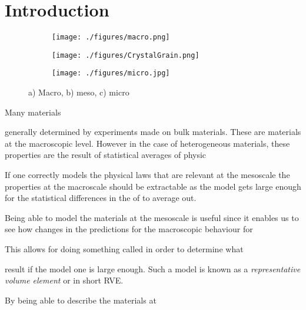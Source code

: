 \documentclass[introduction.tex]{subfiles}
\begin{document}
\chapter{Introduction}



 \begin{figure}
\centering

\begin{subfigure}{.1\textwidth}
  \centering
  \texttt{[image: ./figures/macro.png]}
  \caption{}
  \label{fig:macro}
\end{subfigure}
\label{fig:macro}
\scalebox{1.5}{$\boldsymbol{\longrightarrow}$}
\begin{subfigure}{.33\textwidth}
  \centering
  \texttt{[image: ./figures/CrystalGrain.png]}
  \caption{}
  \label{fig:meso}
\end{subfigure}%
\scalebox{1.5}{$\boldsymbol{\longrightarrow}$}
\begin{subfigure}{.33\textwidth}
  \centering
  \texttt{[image: ./figures/micro.jpg]}
  \caption{}
  \label{fig:micro}
\end{subfigure}%
\caption{a) Macro, b) meso, c) micro\cite{Ozawa:ko5009}}

\end{figure}


Many materials




generally determined by experiments made on bulk materials. These are materials at the macroscopic level. However in the case of heterogeneous materials, these properties are the result of statistical averages of physic 



If one correctly models the physical laws that are relevant at the mesoscale the properties at the macroscale should be extractable as the model gets large enough for the statistical differences in the   of  to average out.

Being able to model the materials at the mesoscale is useful since it enables us to see how changes in the  predictions for the macroscopic behaviour for 

This allows for doing something called in order to determine what 

 result if the model one is large enough. Such a model is known as a \textit{representative volume element} or in short RVE.
 
 
By being able to describe the materials at 
\end{document}
